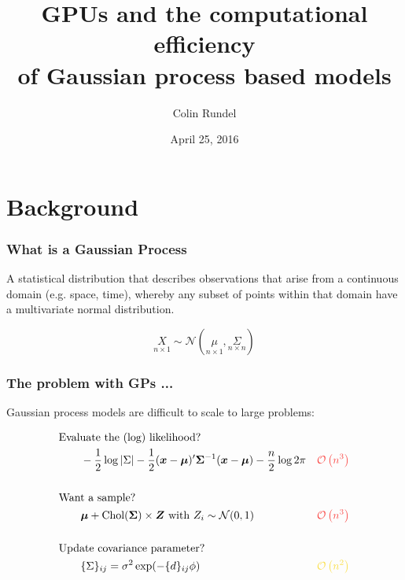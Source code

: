 \documentclass[t]{beamer}\usepackage[]{graphicx}\usepackage[]{color}
\title[GPU GPs]{GPUs and the computational efficiency\\ of Gaussian process based models}
\author{Colin Rundel}
\date{April 25, 2016}
\institute[Duke]{Duke University}
\begin{document}
\begin{frame}[plain]
\titlepage
\end{frame}




\section{Background}
\addtocounter{framenumber}{-1} 


\begin{frame}
\frametitle{What is a Gaussian Process}

A statistical distribution that describes observations that arise from a continuous domain (e.g. space, time), whereby any subset of points within that domain have a multivariate normal distribution.

\[\underset{n \times 1}{X} \sim \mathcal{N}(\underset{n \times 1}{\mu}, \underset{n \times n}{\Sigma})\]


\end{frame}


\begin{frame}
\frametitle{The problem with GPs ...}

Gaussian process models are difficult to scale to large problems:

\begin{align*}
&\text{Evaluate the (log) likelihood?}\\
%
&\qquad -\frac{1}{2} \log |\Sigma| - \frac{1}{2} (\bm{x}-\bm{\mu})' \bm{\Sigma}^{-1} (\bm{x}-\bm{\mu}) - \frac{n}{2}\log 2\pi
&\color{redhl}{\mathcal{O}\left(n^3\right)}\\
\\
&\text{Want a sample?}\\
%
&\qquad \bm{\mu} + \text{Chol}(\bm{\Sigma}) \times \bm{Z} \text{ with } Z_i \sim \mathcal{N}(0,1) 
&\color{redhl}{\mathcal{O}\left(n^3\right)} \\
\\
&\text{Update covariance parameter?} \\
%
&\qquad \{\Sigma\}_{ij} = \sigma^2 \exp(-\{d\}_{ij}\phi) 
&\color{yellowhl}{\mathcal{O}\left(n^2\right)}
\end{align*}
%


\end{frame}
\end{document}
